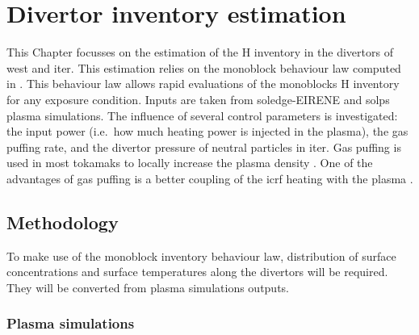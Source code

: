 \setchapterpreamble[u]{\margintoc}
\chapter{Divertor inventory estimation}\label{Chapter4}


This Chapter focusses on the estimation of the \gls{H} \gls{inventory} in the \glspl{divertor} of \gls{west} and \gls{iter}.
This estimation relies on the \gls{monoblock} behaviour law computed in .
This behaviour law allows rapid evaluations of the \glspl{monoblock} \gls{H} \gls{inventory} for any exposure condition.
Inputs are taken from \gls{soledge}-EIRENE \cite{bufferand_three-dimensional_2019} and \gls{solps} \cite{kaveeva_solps-iter_2020} plasma simulations.
The influence of several control parameters is investigated: the input power (i.e.\ how much heating power is injected in the plasma), the gas puffing rate, and the \gls{divertor} pressure of neutral particles in \gls{iter}.
Gas puffing is used in most \glspl{tokamak} to locally increase the \gls{plasma} density \cite{zweben_effect_2014}.
One of the advantages of gas puffing is a better coupling of the \gls{icrf} heating with the plasma \cite{zhang_scrape-off_2019}.

\section{Methodology}
To make use of the \gls{monoblock} \gls{inventory} behaviour law, distribution of surface concentrations and surface temperatures along the \glspl{divertor} will be required.
They will be converted from plasma simulations outputs.

\subsection{Plasma simulations}

